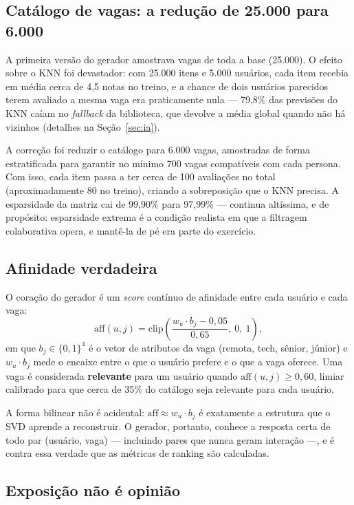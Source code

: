 \documentclass[12pt,a4paper]{article}
\begin{document}
\subsection{Catálogo de vagas: a redução de 25.000 para 6.000}

A primeira versão do gerador amostrava vagas de toda a base (25.000). O efeito sobre o KNN foi devastador: com 25.000 itens e 5.000 usuários, cada item recebia em média cerca de 4,5 notas no treino, e a chance de dois usuários parecidos terem avaliado a mesma vaga era praticamente nula --- 79,8\% das previsões do KNN caíam no \textit{fallback} da biblioteca, que devolve a média global quando não há vizinhos (detalhes na Seção~\ref{sec:ia}).

A correção foi reduzir o catálogo para 6.000 vagas, amostradas de forma estratificada para garantir no mínimo 700 vagas compatíveis com cada persona. Com isso, cada item passa a ter cerca de 100 avaliações no total (aproximadamente 80 no treino), criando a sobreposição que o KNN precisa. A esparsidade da matriz cai de 99,90\% para 97,99\% --- continua altíssima, e de propósito: esparsidade extrema é a condição realista em que a filtragem colaborativa opera, e mantê-la de pé era parte do exercício.

\subsection{Afinidade verdadeira}

O coração do gerador é um \textit{score} contínuo de afinidade entre cada usuário e cada vaga:
\begin{equation}
\text{aff}(u, j) = \text{clip}\left(\frac{w_u \cdot b_j - 0{,}05}{0{,}65},\ 0,\ 1\right),
\end{equation}
em que $b_j \in \{0,1\}^4$ é o vetor de atributos da vaga (remota, tech, sênior, júnior) e $w_u \cdot b_j$ mede o encaixe entre o que o usuário prefere e o que a vaga oferece. Uma vaga é considerada \textbf{relevante} para um usuário quando $\text{aff}(u,j) \geq 0{,}60$, limiar calibrado para que cerca de 35\% do catálogo seja relevante para cada usuário.

A forma bilinear não é acidental: $\text{aff} \approx w_u \cdot b_j$ é exatamente a estrutura que o SVD aprende a reconstruir. O gerador, portanto, conhece a resposta certa de todo par (usuário, vaga) --- incluindo pares que nunca geram interação ---, e é contra essa verdade que as métricas de ranking são calculadas.

\subsection{Exposição não é opinião}
\end{document}
